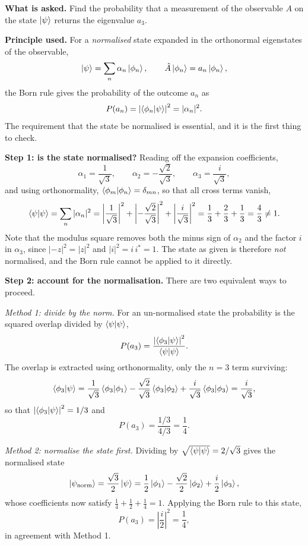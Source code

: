 \documentclass[12pt]{article}
\newif\ifsolutions
\begin{document}
\ifsolutions
\begin{solutionbox}
\textbf{What is asked.} Find the probability that a measurement of the observable $A$ on the state $\ket{\psi}$ returns the eigenvalue $a_{3}$.

\textbf{Principle used.} For a \emph{normalised} state expanded in the orthonormal eigenstates of the observable,
\[
    \ket{\psi}=\sum_{n}\alpha_{n}\ket{\phi_{n}},
    \qquad
    \hat{A}\ket{\phi_{n}}=a_{n}\ket{\phi_{n}},
\]
the Born rule gives the probability of the outcome $a_{n}$ as
\[
    P(a_{n})=\left|\braket{\phi_{n}|\psi}\right|^{2}=|\alpha_{n}|^{2}.
\]
The requirement that the state be normalised is essential, and it is the first thing to check.

\textbf{Step 1: is the state normalised?} Reading off the expansion coefficients,
\[
    \alpha_{1}=\frac{1}{\sqrt{3}},
    \qquad
    \alpha_{2}=-\frac{\sqrt{2}}{\sqrt{3}},
    \qquad
    \alpha_{3}=\frac{i}{\sqrt{3}},
\]
and using orthonormality, $\braket{\phi_{m}|\phi_{n}}=\delta_{mn}$, so that all cross terms vanish,
\[
    \braket{\psi|\psi}=\sum_{n}|\alpha_{n}|^{2}
    =\left|\frac{1}{\sqrt{3}}\right|^{2}
    +\left|-\frac{\sqrt{2}}{\sqrt{3}}\right|^{2}
    +\left|\frac{i}{\sqrt{3}}\right|^{2}
    =\frac{1}{3}+\frac{2}{3}+\frac{1}{3}
    =\frac{4}{3}\neq 1 .
\]
Note that the modulus square removes both the minus sign of $\alpha_{2}$ and the factor $i$ in $\alpha_{3}$, since $|-z|^{2}=|z|^{2}$ and $|i|^{2}=i\,i^{*}=1$. The state as given is therefore \emph{not} normalised, and the Born rule cannot be applied to it directly.

\textbf{Step 2: account for the normalisation.} There are two equivalent ways to proceed.

\emph{Method 1: divide by the norm.} For an un-normalised state the probability is the squared overlap divided by $\braket{\psi|\psi}$,
\[
    P(a_{3})=\frac{\left|\braket{\phi_{3}|\psi}\right|^{2}}{\braket{\psi|\psi}} .
\]
The overlap is extracted using orthonormality, only the $n=3$ term surviving:
\[
    \braket{\phi_{3}|\psi}
    =\frac{1}{\sqrt{3}}\braket{\phi_{3}|\phi_{1}}
    -\frac{\sqrt{2}}{\sqrt{3}}\braket{\phi_{3}|\phi_{2}}
    +\frac{i}{\sqrt{3}}\braket{\phi_{3}|\phi_{3}}
    =\frac{i}{\sqrt{3}} ,
\]
so that $\left|\braket{\phi_{3}|\psi}\right|^{2}=1/3$ and
\[
    P(a_{3})=\frac{1/3}{4/3}=\frac{1}{4} .
\]

\emph{Method 2: normalise the state first.} Dividing by $\sqrt{\braket{\psi|\psi}}=2/\sqrt{3}$ gives the normalised state
\[
    \ket{\psi_{\text{norm}}}
    =\frac{\sqrt{3}}{2}\ket{\psi}
    =\frac{1}{2}\ket{\phi_{1}}-\frac{\sqrt{2}}{2}\ket{\phi_{2}}+\frac{i}{2}\ket{\phi_{3}} ,
\]
whose coefficients now satisfy $\tfrac{1}{4}+\tfrac{1}{2}+\tfrac{1}{4}=1$. Applying the Born rule to this state,
\[
    P(a_{3})=\left|\frac{i}{2}\right|^{2}=\frac{1}{4},
\]
in agreement with Method 1.


\end{solutionbox}
\end{document}
